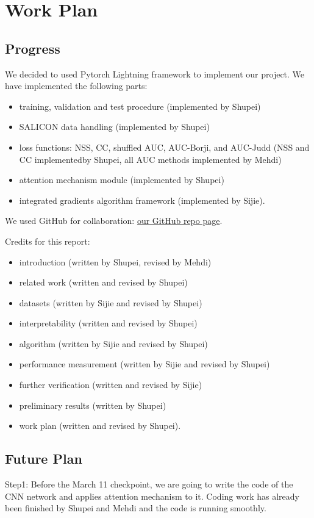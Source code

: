 \documentclass[12pt]{article}
\begin{document}
\section{Work Plan}
\subsection{Progress}
We decided to used Pytorch Lightning framework \cite{falcon2019pytorch} to implement our project.
We have implemented the following parts:
\begin{itemize}
    \item training, validation and test procedure (implemented by Shupei)
    \item SALICON data handling (implemented by Shupei)
    \item loss functions: NSS, CC, shuffled AUC, AUC-Borji, and AUC-Judd (NSS and CC implementedby Shupei, all AUC methods implemented by Mehdi)
    \item attention mechanism module (implemented by Shupei)
    \item integrated gradients algorithm framework (implemented by Sijie).
\end{itemize}
We used GitHub for collaboration: \href{https://github.com/Freddiechang/CMPUT566}{our GitHub repo page}.

Credits for this report:
\begin{itemize}
    \item introduction (written by Shupei, revised by Mehdi)
    \item related work (written and revised by Shupei)
    \item datasets (written by Sijie and revised by Shupei)
    \item interpretability (written and revised by Shupei)
    \item algorithm (written by Sijie and revised by Shupei)
    \item performance measurement (written by Sijie and revised by Shupei)
    \item further verification (written and revised by Sijie)
    \item preliminary results (written by Shupei)
    \item work plan (written and revised by Shupei).
\end{itemize}

\subsection{Future Plan}
Step1: Before the March 11 checkpoint, we are going to write the code of the CNN network and applies attention mechanism to it. Coding work has already been finished by Shupei and Mehdi and the code is running smoothly.
\end{document}
